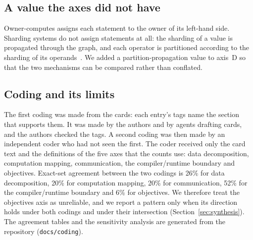 \subsection{A value the axes did not have}
Owner-computes assigns each statement to the owner of its left-hand side. Sharding systems do not assign statements at all: the sharding of a value is propagated through the graph, and each operator is partitioned according to the sharding of its operands~\cite{xu2021gspmd,alabed2025partir}. We added a partition-propagation value to axis~D so that the two mechanisms can be compared rather than conflated.

\subsection{Coding and its limits}
The first coding was made from the cards: each entry's tags name the section that supports them. It was made by the authors and by agents drafting cards, and the authors checked the tags. A second coding was then made by an independent coder who had not seen the first. The coder received only the card text and the definitions of the five axes that the counts use: data decomposition, computation mapping, communication, the compiler/runtime boundary and objectives. Exact-set agreement between the two codings is 26\% for data decomposition, 20\% for computation mapping, 20\% for communication, 52\% for the compiler/runtime boundary and 6\% for objectives. We therefore treat the objectives axis as unreliable, and we report a pattern only when its direction holds under both codings and under their intersection (Section~\ref{sec:synthesis}). The agreement tables and the sensitivity analysis are generated from the repository (\texttt{docs/coding}).
